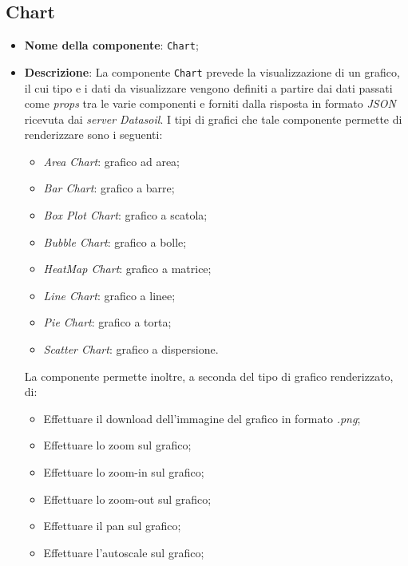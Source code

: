 \subsection{Chart}
\begin{itemize}
      \item \textbf{Nome della componente}: \texttt{Chart};
      \item \textbf{Descrizione}: La componente \texttt{Chart} prevede la visualizzazione di un grafico, il cui tipo e i dati da visualizzare vengono definiti a partire dai dati passati
            come \textit{props} tra le varie componenti e forniti dalla risposta in formato \textit{JSON} ricevuta dai \textit{server Datasoil}. \newline
            I tipi di grafici che tale componente permette di renderizzare sono i seguenti:
            \begin{itemize}
                  \item \textit{Area Chart}: grafico ad area;
                  \item \textit{Bar Chart}: grafico a barre;
                  \item \textit{Box Plot Chart}: grafico a scatola;
                  \item \textit{Bubble Chart}: grafico a bolle;
                  \item \textit{HeatMap Chart}: grafico a matrice;
                  \item \textit{Line Chart}: grafico a linee;
                  \item \textit{Pie Chart}: grafico a torta;
                  \item \textit{Scatter Chart}: grafico a dispersione.
            \end{itemize}
            La componente permette inoltre, a seconda del tipo di grafico renderizzato, di:
            \begin{itemize}
                  \item Effettuare il download dell'immagine del grafico in formato \textit{.png};
                  \item Effettuare lo zoom sul grafico;
                  \item Effettuare lo zoom-in sul grafico;
                  \item Effettuare lo zoom-out sul grafico;
                  \item Effettuare il pan sul grafico;
                  \item Effettuare l'autoscale sul grafico;

\end{itemize}
\end{itemize}
